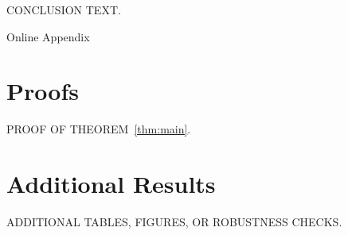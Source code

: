 \documentclass[english, 12pt, a4paper]{article}
\begin{document}
CONCLUSION TEXT.

\newpage


\appendix

\newpage
\setcounter{page}{1}
\begin{center}
    {\huge Online Appendix}
\end{center}

\section{Proofs}
\label{proof:main}

PROOF OF THEOREM~\ref{thm:main}.

\section{Additional Results}   %

ADDITIONAL TABLES, FIGURES, OR ROBUSTNESS CHECKS.
\end{document}
